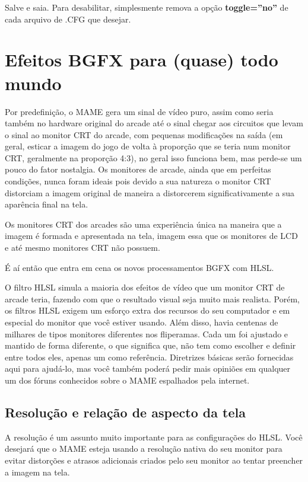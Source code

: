 \documentclass[letterpaper,10pt,brazil]{sphinxmanual}
\begin{document}
Salve e saia.
Para desabilitar, simplesmente remova a opção \textbf{toggle=''no''} de cada
arquivo de .CFG que desejar.


\section{Efeitos BGFX para (quase) todo mundo}
\label{advanced/bgfx::doc}\label{advanced/bgfx:efeitos-bgfx-para-quase-todo-mundo}
Por predefinição, o MAME gera um sinal de vídeo puro, assim como seria
também no hardware original do arcade até o sinal chegar aos circuitos
que levam o sinal ao monitor CRT do arcade, com pequenas modificações na
saída (em geral, esticar a imagem do jogo de volta à proporção que se
teria num monitor CRT, geralmente na proporção 4:3), no geral isso
funciona bem, mas perde-se um pouco do fator nostalgia. Os monitores de
arcade, ainda que em perfeitas condições, nunca foram ideais pois devido
a sua natureza o monitor CRT distorciam a imagem original de maneira
a distorcerem significativamente a sua aparência final na tela.

Os monitores CRT dos arcades são uma experiência única na maneira que a
imagem é formada e apresentada na tela, imagem essa que os monitores de
LCD e até mesmo monitores CRT não possuem.

É aí então que entra em cena os novos processamentos BGFX com HLSL.

O filtro HLSL simula a maioria dos efeitos de vídeo que um monitor CRT
de arcade teria, fazendo com que o resultado visual seja muito mais
realista. Porém, os filtros HLSL exigem um esforço extra dos recursos do
seu computador e em especial do monitor que você estiver usando.
Além disso, havia centenas de milhares de tipos monitores diferentes nos
fliperamas. Cada um foi ajustado e mantido de forma diferente, o que
significa que, não tem como escolher e definir entre todos eles, apenas
um como referência. Diretrizes básicas serão fornecidas aqui para
ajudá-lo, mas você também poderá pedir mais opiniões em qualquer um dos
fóruns conhecidos sobre o MAME espalhados pela internet.


\subsection{Resolução e relação de aspecto da tela}
\label{advanced/bgfx:resolucao-e-relacao-de-aspecto-da-tela}
A resolução é um assunto muito importante para as configurações do HLSL.
Você desejará que o MAME esteja usando a resolução nativa do seu monitor
para evitar distorções e atrasos adicionais criados pelo seu monitor ao
tentar preencher a imagem na tela.
\end{document}
